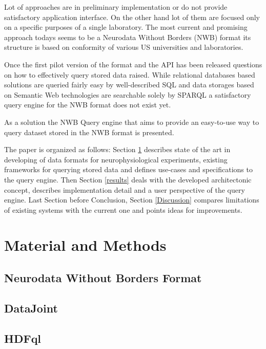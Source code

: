 \documentclass[utf8]{frontiersSCNS} %
\begin{document}
Lot of approaches are in preliminary implementation or do not provide satisfactory application interface. On the other hand lot of them are focused only on a specific purposes of a single laboratory. The most current and promising approach todays seems to be a Neurodata Without Borders (NWB) format its structure is based on conformity of various US universities and laboratories.

Once the first pilot version of the format and the API has been released \citep{teeters-neuron} questions on how to effectively query stored data raised. While relational databases based solutions are queried fairly easy by well-described SQL and data storages based on Semantic Web technologies are searchable solely by SPARQL \citep{prudhommeaux2008sparql} a satisfactory query engine for the NWB format does not exist yet.

As a solution the NWB Query engine that aims to provide an easy-to-use way to query dataset stored in the NWB format is presented.

The paper is organized as follows: Section \ref{materials_and_methods} describes state of the art in developing of data formats for neurophysiological experiments, existing frameworks for querying stored data and defines use-cases and specifications to the query engine. Then Section \ref{results} deals with the developed architectonic concept, describes implementation detail and a user perspective of the query engine. Last Section before Conclusion, Section \ref{Discussion} compares limitations of existing systems with the current one and points ideas for improvements.


\section{Material and Methods}
\label{materials_and_methods}

\subsection{Neurodata Without Borders Format}

\subsection{DataJoint}

\subsection{HDFql}
\end{document}

